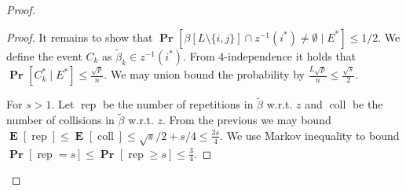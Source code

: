 \documentclass{article}
\newcommand{\probs}[2]{\operatorname{\mathbf{Pr}}_{{#1}}\left[{#2}\right]}
\newcommand{\prob}[1]{\probs{}{#1}}
\newcommand{\expects}[2]{\operatorname{\mathbf{E}}_{{#1}}\left[{#2}\right]}
\newcommand{\expect}[1]{\expects{}{#1}}
\begin{document}
\begin{proof}
\begin{proof}
It remains to show that $\prob{\beta[L \setminus \{i, j\}] \cap z^{-1}(i^{*}) \neq \emptyset \mid E^{*}} \leq 1/2.$ We define the event $C_k$ as $\tilde \beta_k \in z^{-1}(i^{*})$. From $4$-independence it holds that $\prob{C^{*}_k \mid E^{*}} \leq \frac{\sqrt{p}}{n}$. We may union bound the probability by $\frac{L\sqrt{p}}{n} \leq \frac{\sqrt{s}}{2}$.

For $s > 1$. Let $\operatorname{rep}$ be the number of repetitions in $\tilde \beta$ w.r.t. $z$ and $\operatorname{coll}$ be the number of collisions in $\tilde \beta$ w.r.t. $z$. 
From the previous we may bound $\expect{\operatorname{rep}} \leq \expect{\operatorname{coll}} \leq \sqrt{s}/2 + s/4 \leq \frac{3s}{4}.$
We use Markov inequality to bound $\prob{\operatorname{rep} = s} \leq \prob{\operatorname{rep} \geq s} \leq \frac{3}{4}.$ 
\end{proof}

\end{proof}
\end{document}
